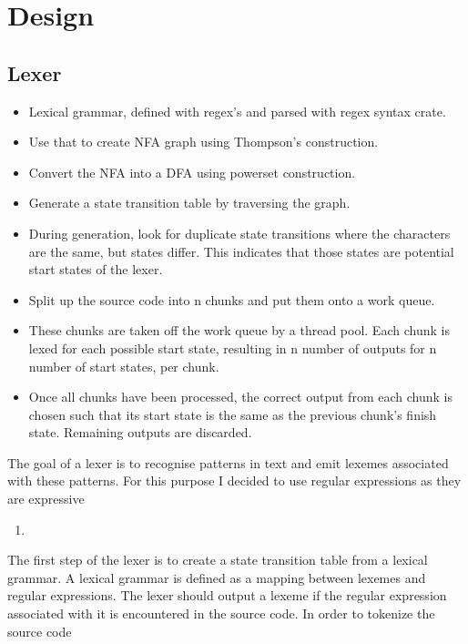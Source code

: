 \chapter{Design} \label{design}

\section{Lexer}
\begin{itemize}
	\item Lexical grammar, defined with regex's and parsed with regex syntax crate.
	\item Use that to create NFA graph using Thompson's construction.
	\item Convert the NFA into a DFA using powerset construction.
	\item Generate a state transition table by traversing the graph.
	\item During generation, look for duplicate state transitions where the
		  characters are the same, but states differ. This indicates that those
		  states are potential start states of the lexer.
	\item Split up the source code into n chunks and put them onto a work queue.
	\item These chunks are taken off the work queue by a thread pool. Each chunk
		  is lexed for each possible start state, resulting in n number of outputs for n
		  number of start states, per chunk.
	\item 
	Once all chunks have been processed, the correct output from each chunk is
		  chosen such that its start state is the same as the previous chunk's finish
    	  state. Remaining outputs are discarded.
\end{itemize}

The goal of a lexer is to recognise patterns in text and emit lexemes associated
with these patterns. For this purpose I decided to use regular expressions as they 
are expressive

\begin{comment}
Insert a figure here like the one in data-parallel finite state machines.
\end{comment}

\begin{enumerate}
	\item 
\end{enumerate}

The first step of the lexer is to create a state transition table from a
lexical grammar. A lexical grammar is defined as a mapping between lexemes and
regular expressions. The lexer should output a lexeme if the regular expression
associated with it is encountered in the source code. In order to tokenize the source code 


